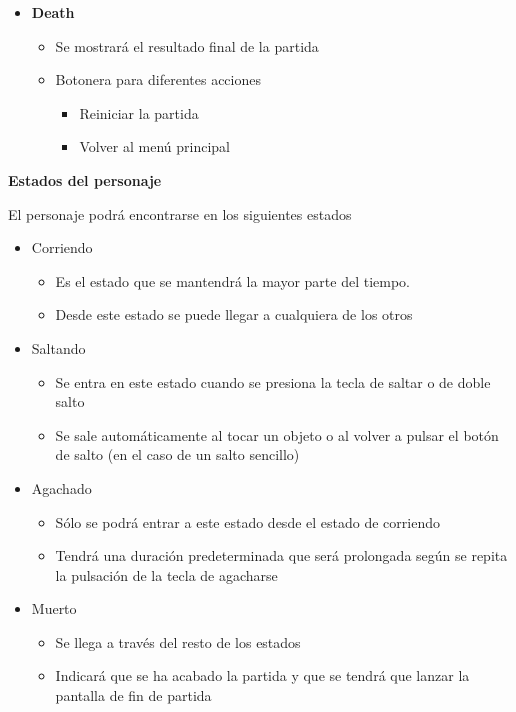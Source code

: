\documentclass[a4paper]{article}
\begin{document}
\begin{itemize}
\begin{itemize}
        \end{itemize}
    \item \textbf{Death}
        \begin{itemize}
            \item Se mostrará el resultado final de la partida
            \item Botonera para diferentes acciones
                \begin{itemize}
                    \item Reiniciar la partida
                    \item Volver al menú principal
                \end{itemize}
        \end{itemize}
\end{itemize}



\textbf{Estados del personaje}

El personaje podrá encontrarse en los siguientes estados

\begin{itemize}
    \item Corriendo
    \begin{itemize}
        \item Es el estado que se mantendrá la mayor parte del tiempo. 
        \item Desde este estado se puede llegar a cualquiera de los otros
    \end{itemize}
    \item Saltando
    \begin{itemize}
        \item Se entra en este estado cuando se presiona la tecla de saltar o de doble salto
        \item Se sale automáticamente al tocar un objeto o al volver a pulsar el botón de salto (en el caso de un salto sencillo)
    \end{itemize}
    \item Agachado
    \begin{itemize}
        \item Sólo se podrá entrar a este estado desde el estado de corriendo
        \item Tendrá una duración predeterminada que será prolongada según se repita la pulsación de la tecla de agacharse
    \end{itemize}
    \item Muerto
    \begin{itemize}
        \item Se llega a través del resto de los estados
        \item Indicará que se ha acabado la partida y que se tendrá que lanzar la pantalla de fin de partida
    \end{itemize}
\end{itemize}
\end{document}
